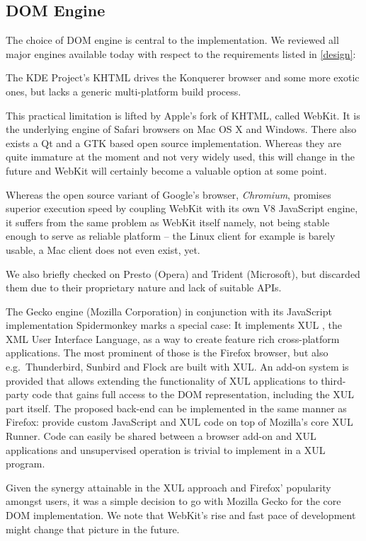 \subsection{DOM Engine\label{dom}}

The choice of DOM engine is central to the implementation.
We reviewed all major engines available today with respect to the requirements listed in \ref{design}:

The KDE Project's KHTML drives the Konquerer browser and some more exotic ones, but lacks a generic multi-platform build process.

This practical limitation is lifted by Apple's fork of KHTML, called WebKit.
It is the underlying engine of Safari browsers on Mac OS X and Windows. %
There also exists a Qt and a GTK based open source implementation.
Whereas they are quite immature at the moment and not very widely used, this will change in the future and WebKit will certainly become a valuable option at some point.

Whereas the open source variant of Google's browser, \textit{Chromium}, promises superior execution speed by coupling WebKit with its own V8 JavaScript engine, it suffers from the same problem as WebKit itself namely, not being stable enough to serve as reliable platform --
the Linux client for example is barely usable, a Mac client does not even exist, yet.

We also briefly checked on Presto (Opera) and Trident (Microsoft), but discarded them due to their proprietary nature and lack of suitable APIs.

The Gecko engine (Mozilla Corporation) in conjunction with its JavaScript implementation Spidermonkey marks a special case:
It implements XUL \cite{xul}, the XML User Interface Language, as a way to create feature rich cross-platform applications.
The most prominent of those is the Firefox browser, but also e.g.~Thunderbird, Sunbird and Flock are built with XUL.
An add-on system is provided that allows extending the functionality of XUL applications to third-party code that gains full access to the DOM representation, including the XUL part itself.
The proposed {\KrdWrd} back-end can be implemented in the same manner as Firefox: provide custom JavaScript and XUL code on top of Mozilla's core XUL Runner. 
Code can easily be shared between a browser add-on and XUL applications and unsupervised operation is trivial to implement in a XUL program.

Given the synergy attainable in the XUL approach and Firefox' popularity amongst users, it was a simple decision to go with Mozilla Gecko for the core DOM implementation.
We note that WebKit's rise and fast pace of development might change that picture in the future.


